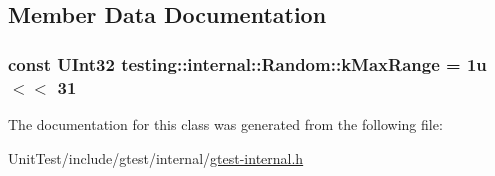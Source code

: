 \subsection{Member Data Documentation}
\hypertarget{classtesting_1_1internal_1_1_random_a36d72dd7063d0b5338f229e75382fdd2}{
\subsubsection[{k\+Max\+Range}]{\setlength{\rightskip}{0pt plus 5cm}const {\bf U\+Int32} testing\+::internal\+::\+Random\+::k\+Max\+Range = 1u $<$$<$ 31\hspace{0.3cm}{\ttfamily [static]}}}\label{classtesting_1_1internal_1_1_random_a36d72dd7063d0b5338f229e75382fdd2}


The documentation for this class was generated from the following file\+:\begin{DoxyCompactItemize}
\item 
Unit\+Test/include/gtest/internal/\hyperlink{gtest-internal_8h}{gtest-\/internal.\+h}\end{DoxyCompactItemize}
